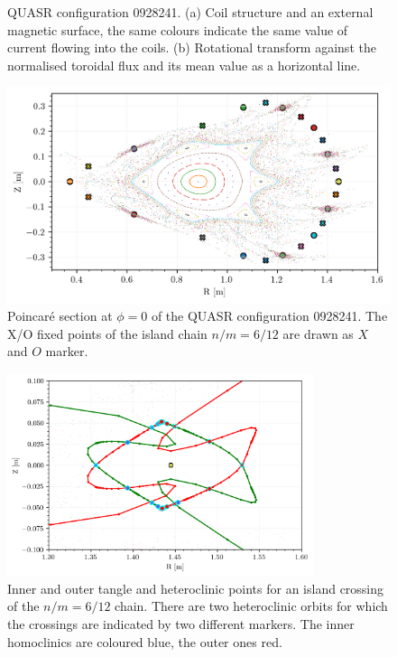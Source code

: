 \begin{figure}[H]
\begin{subfigure}[t]{0.52\textwidth}
        \caption{}
        \label{fig:iota-0928241}
    \end{subfigure}
    \caption{QUASR configuration 0928241. (a) Coil structure and an external magnetic surface, the same colours indicate the same value of current flowing into the coils. (b) Rotational transform against the normalised toroidal flux and its mean value as a horizontal line.}
    \label{fig:config-0928241}
\end{figure}

\begin{figure}[H]
    \centering
    \includegraphics{images/quasrs/fixedpoint_ox_0928241.png}
    \caption{Poincaré section at $\phi=0$ of the QUASR configuration 0928241. The X/O fixed points of the island chain $n/m = 6/12$ are drawn as $X$ and $O$ marker.}
    \label{fig:p-0928241}
\end{figure}


\begin{figure}[H]
    \centering
    \includegraphics[width=0.8\textwidth]{images/quasrs/outer_0928241.png}
    \caption{Inner and outer tangle and heteroclinic points for an island crossing of the $n/m  = 6/12$ chain. There are two heteroclinic orbits for which the crossings are indicated by two different markers. The inner homoclinics are coloured blue, the outer ones red.}
    \label{fig:turn-0928241}
\end{figure}

